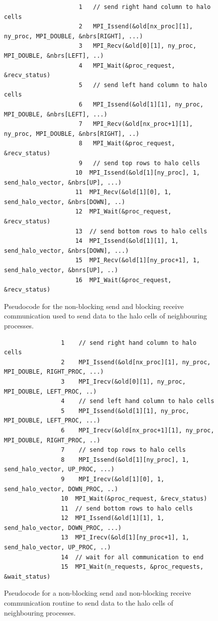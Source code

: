 \documentclass[11pt, a4paper]{article}
\begin{document}
			\begin{figure}
				\begin{verbatim}
					 1	 // send right hand column to halo cells
					 2	 MPI_Issend(&old[nx_proc][1], ny_proc, MPI_DOUBLE, &nbrs[RIGHT], ...)
					 3	 MPI_Recv(&old[0][1], ny_proc, MPI_DOUBLE, &nbrs[LEFT], ..)
					 4	 MPI_Wait(&proc_request, &recv_status)
					 5	 // send left hand column to halo cells
					 6	 MPI_Issend(&old[1][1], ny_proc, MPI_DOUBLE, &nbrs[LEFT], ...)
					 7	 MPI_Recv(&old[nx_proc+1][1], ny_proc, MPI_DOUBLE, &nbrs[RIGHT], ..)
					 8	 MPI_Wait(&proc_request, &recv_status)		
					 9	 // send top rows to halo cells
					10	MPI_Issend(&old[1][ny_proc], 1, send_halo_vector, &nbrs[UP], ...)
					11	MPI_Recv(&old[1][0], 1, send_halo_vector, &nbrs[DOWN], ..)
					12	MPI_Wait(&proc_request, &recv_status)
					13	// send bottom rows to halo cells
					14	MPI_Issend(&old[1][1], 1, send_halo_vector, &nbrs[DOWN], ...)
					15	MPI_Recv(&old[1][ny_proc+1], 1, send_halo_vector, &bnrs[UP], ..)
					16	MPI_Wait(&proc_request, &recv_status)		
				\end{verbatim}
				\caption{Pseudocode for the non-blocking send and blocking receive communication used to send data to the halo cells of neighbouring processes.}
				\label{fig:communication}
			\end{figure}
			
			\begin{figure}
				\begin{verbatim}
				1	 // send right hand column to halo cells
				2	 MPI_Issend(&old[nx_proc][1], ny_proc, MPI_DOUBLE, RIGHT_PROC, ...)
				3	 MPI_Irecv(&old[0][1], ny_proc, MPI_DOUBLE, LEFT_PROC, ..)
				4	 // send left hand column to halo cells
				5	 MPI_Issend(&old[1][1], ny_proc, MPI_DOUBLE, LEFT_PROC, ...)
				6	 MPI_Irecv(&old[nx_proc+1][1], ny_proc, MPI_DOUBLE, RIGHT_PROC, ..)
				7	 // send top rows to halo cells
				8	 MPI_Issend(&old[1][ny_proc], 1, send_halo_vector, UP_PROC, ...)
				9	 MPI_Irecv(&old[1][0], 1, send_halo_vector, DOWN_PROC, ..)
				10	MPI_Wait(&proc_request, &recv_status)
				11	// send bottom rows to halo cells
				12	MPI_Issend(&old[1][1], 1, send_halo_vector, DOWN_PROC, ...)
				13	MPI_Irecv(&old[1][ny_proc+1], 1, send_halo_vector, UP_PROC, ..)
				14	// wait for all communication to end
				15	MPI_Wait(n_requests, &proc_requests, &wait_status)		
				\end{verbatim}
				\caption{Pseudocode for a non-blocking send and non-blocking receive communication routine to send data to the halo cells of neighbouring processes.}
				\label{fig:communication2}
			\end{figure}
			
\end{document}
